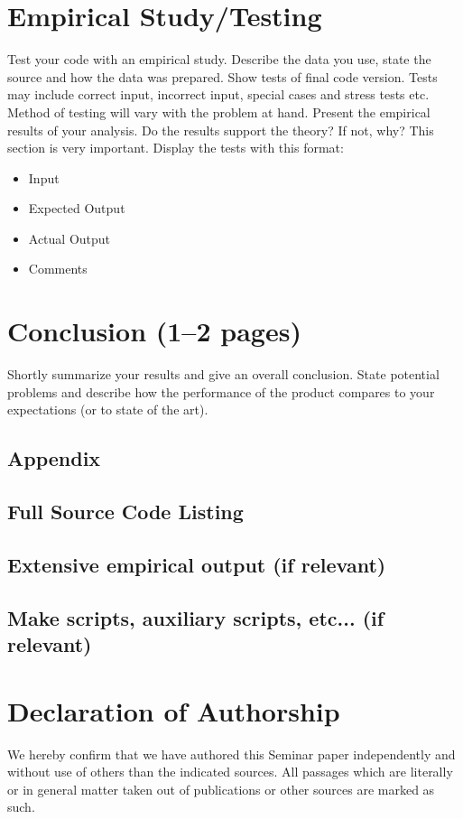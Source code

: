 \documentclass[a4paper,12pt,notitlepage]{article}
\begin{document}
\section{Empirical Study/Testing}
Test your code with an empirical study. Describe the data you use, state 
the source and how the data was  prepared. Show  tests  of  final  code
version.  Tests may include  correct  input, incorrect  input,  special
cases  and  stress  tests etc. Method of testing will vary with the problem
at  hand. Present  the  empirical  results  of  your  analysis. Do  the
results  support  the theory?  If not, why? This section is very important.
Display the tests with this format:
\begin{itemize}
    \item Input
    \item Expected Output
    \item Actual Output
    \item Comments
\end{itemize}

\section{Conclusion (1--2 pages)}
Shortly summarize your results and give an overall conclusion. State
potential problems and describe how the performance of the product 
compares to your expectations (or to state of the art).

\newpage
\begin{appendix}
\section{Appendix}
\subsection{Full Source Code Listing}
\subsection{Extensive empirical output (if relevant)}
\subsection{Make scripts, auxiliary scripts, etc... (if relevant)}
\end{appendix}

\newpage
\section*{Declaration of Authorship}
We hereby confirm that we have authored this Seminar paper independently 
and without use of others than the indicated sources. All passages which
are literally or in general matter taken out of publications or other
sources are marked as such.

\vspace{0.5cm}


\newpage
\nocite{*}
\printbibliography
\end{document}
